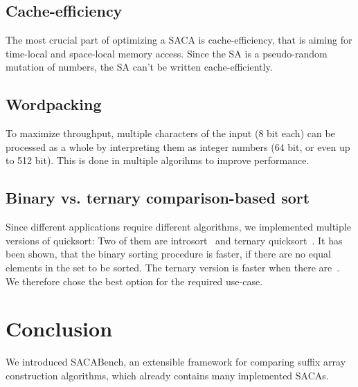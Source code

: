 \subsection{Cache-efficiency}

The most crucial part of optimizing a SACA is cache-efficiency, that is aiming for time-local and space-local memory access.
Since the SA is a pseudo-random mutation of numbers, the SA can't be written cache-efficiently.

\subsection{Wordpacking}

To maximize throughput, multiple characters of the input (8 bit each) can be processed as a whole by interpreting them as integer numbers (64 bit, or even up to 512 bit).
This is done in multiple algorihms to improve performance.

\subsection{Binary vs. ternary comparison-based sort}

Since different applications require different algorithms, we implemented multiple versions of quicksort:
Two of them are introsort~\cite{Musser97} and ternary quicksort~\cite{ternary_quicksort}.
It has been shown, that the binary sorting procedure is faster, if there are no equal elements in the set to be sorted.
The ternary version is faster when there are~\cite{ternary_quicksort}.
We therefore chose the best option for the required use-case.

\section{Conclusion}

We introduced SACABench, an extensible framework for comparing suffix array construction algorithms,
which already contains many implemented SACAs.


\blindtext

\blindtext

